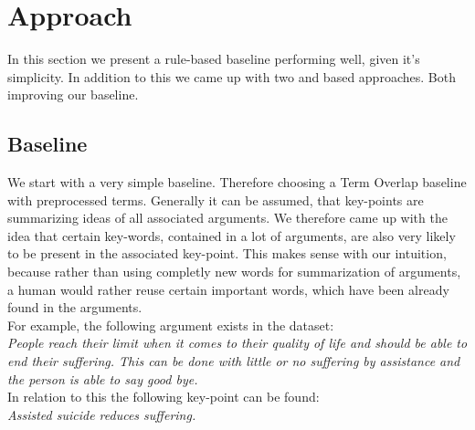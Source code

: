 \section{Approach}

In this section we present a rule-based baseline performing well, given it's simplicity. In addition to this we came up 
with two \Bert and \Roberta based approaches. Both improving our baseline. 

\subsection{Baseline}

We start with a very simple baseline. Therefore choosing a Term Overlap baseline with preprocessed terms. 
Generally it can be assumed, that key-points are summarizing ideas of all associated arguments. We therefore came up with the idea
that certain key-words, contained in a lot of arguments, are also very likely to be present in the associated key-point. This makes 
sense with our intuition, because rather than using completly new words for summarization of arguments, a human would 
rather reuse certain important words, which have been already found in the arguments.\\
For example, the following argument exists in the \ArgKP dataset:\\
\textit{People reach their limit when it comes to 
their quality of life and should be able to end their {\color{blue} suffering}. This can be done with little 
or no {\color{blue} suffering} by {\color{orange} assistance} and the person is able to say good bye.}\\ 

In relation to this the following key-point can be found:\\
\textit{{\color{orange} Assisted} suicide reduces {\color{blue} suffering}.}\\

